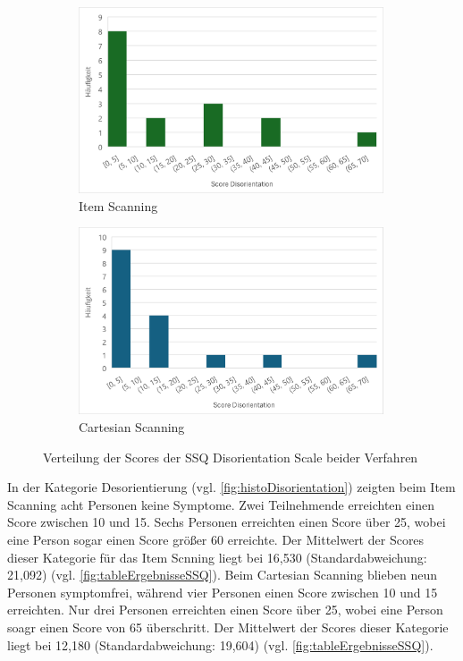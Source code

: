 \begin{figure}
    \centering
    \begin{subfigure}{.5\textwidth}
        \centering
        \includegraphics[width=0.99\textwidth]{images/Results/Histogramm-Disorientation-Scale-Item.png}
        \caption{Item Scanning}
        \label{fig:histoDisorientationItem}   
    \end{subfigure}%
    \begin{subfigure}{.5\textwidth}
        \centering
        \includegraphics[width=0.99\textwidth]{images/Results/Histogramm-Disorientation-Scale-Cartesian.png}
         \caption{Cartesian Scanning}
         \label{fig:histoDisorientationCartesian}
    \end{subfigure}
    \caption{Verteilung der Scores der SSQ Disorientation Scale beider Verfahren}
    \label{fig:histoDisorientation}
\end{figure}

In der Kategorie Desorientierung (vgl. \autoref{fig:histoDisorientation}) zeigten beim Item Scanning acht Personen keine Symptome. Zwei Teilnehmende erreichten einen Score zwischen 10 und 15. Sechs Personen erreichten einen Score über 25, wobei eine Person sogar einen Score größer 60 erreichte. Der Mittelwert der Scores dieser Kategorie für das Item Scnning liegt bei 16,530 (Standardabweichung: 21,092) (vgl. \autoref{fig:tableErgebnisseSSQ}). Beim Cartesian Scanning blieben neun Personen symptomfrei, während vier Personen einen Score zwischen 10 und 15 erreichten. Nur drei Personen erreichten einen Score über 25, wobei eine Person soagr einen Score von 65 überschritt. Der Mittelwert der Scores dieser Kategorie liegt bei 12,180 (Standardabweichung: 19,604) (vgl. \autoref{fig:tableErgebnisseSSQ}).

